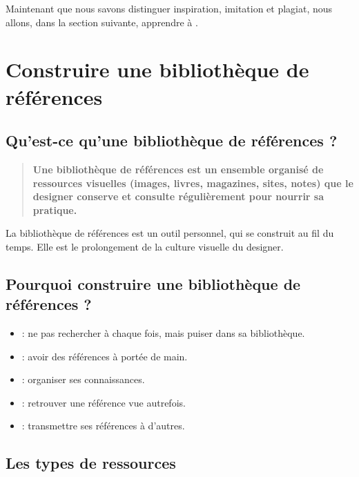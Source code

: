 Maintenant que nous savons distinguer inspiration, imitation et plagiat, nous allons, dans la section suivante, apprendre à .


\section{Construire une bibliothèque de références}

\subsection{Qu'est-ce qu'une bibliothèque de références ?}

\begin{quote}
\textbf{Une bibliothèque de références est un ensemble organisé de ressources visuelles (images, livres, magazines, sites, notes) que le designer conserve et consulte régulièrement pour nourrir sa pratique.}
\end{quote}

La bibliothèque de références est un outil personnel, qui se construit au fil du temps. Elle est le prolongement de la culture visuelle du designer.

\subsection{Pourquoi construire une bibliothèque de références ?}

\begin{itemize}
    \item {} : ne pas rechercher à chaque fois, mais puiser dans sa bibliothèque.
    \item {} : avoir des références à portée de main.
    \item {} : organiser ses connaissances.
    \item {} : retrouver une référence vue autrefois.
    \item {} : transmettre ses références à d'autres.
\end{itemize}

\subsection{Les types de ressources}

